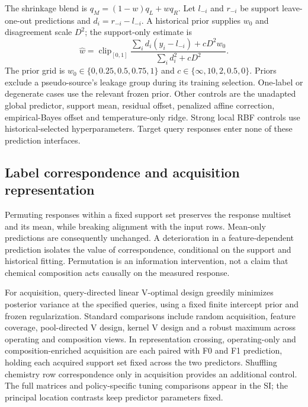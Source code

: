 \documentclass[11pt]{article}
\begin{document}
The shrinkage blend is $q_M=(1-w)q_L+wq_R$. Let $l_{-i}$ and $r_{-i}$ be support leave-one-out predictions and $d_i=r_{-i}-l_{-i}$. A historical prior supplies $w_0$ and disagreement scale $D^2$; the support-only estimate is
\begin{equation}\label{eq:blend}
\widehat w=\operatorname{clip}_{[0,1]}
\frac{\sum_i d_i(y_i-l_{-i})+cD^2w_0}{\sum_i d_i^2+cD^2}.
\end{equation}
The prior grid is $w_0\in\{0,0.25,0.5,0.75,1\}$ and $c\in\{\infty,10,2,0.5,0\}$. Priors exclude a pseudo-source's leakage group during its training selection. One-label or degenerate cases use the relevant frozen prior. Other controls are the unadapted global predictor, support mean, residual offset, penalized affine correction, empirical-Bayes offset and temperature-only ridge. Strong local RBF controls use historical-selected hyperparameters. Target query responses enter none of these prediction interfaces.

\subsection{Label correspondence and acquisition representation}
Permuting responses within a fixed support set preserves the response multiset and its mean, while breaking alignment with the input rows. Mean-only predictions are consequently unchanged. A deterioration in a feature-dependent prediction isolates the value of correspondence, conditional on the support and historical fitting. Permutation is an information intervention, not a claim that chemical composition acts causally on the measured response.

For acquisition, query-directed linear V-optimal design greedily minimizes posterior variance at the specified queries, using a fixed finite intercept prior and frozen regularization. Standard comparisons include random acquisition, feature coverage, pool-directed V design, kernel V design and a robust maximum across operating and composition views. In representation crossing, operating-only and composition-enriched acquisition are each paired with F0 and F1 prediction, holding each acquired support set fixed across the two predictors. Shuffling chemistry row correspondence only in acquisition provides an additional control. The full matrices and policy-specific tuning comparisons appear in the SI; the principal location contrasts keep predictor parameters fixed.
\end{document}
